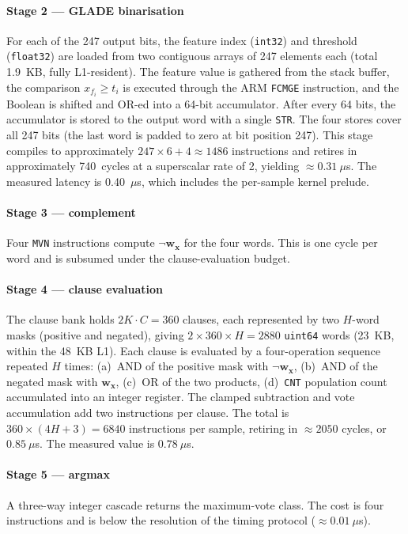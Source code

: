 \documentclass[journal,10pt]{IEEEtran}
\begin{document}
\paragraph{Stage 2 --- GLADE binarisation}
For each of the 247 output bits, the feature index (\texttt{int32})
and threshold (\texttt{float32}) are loaded from two contiguous
arrays of 247 elements each (total 1.9~KB, fully L1-resident). The
feature value is gathered from the stack buffer, the comparison
$x_{f_i} \ge t_i$ is executed through the ARM \texttt{FCMGE}
instruction, and the Boolean is shifted and OR-ed into a 64-bit
accumulator. After every 64 bits, the accumulator is stored to the
output word with a single \texttt{STR}. The four stores cover all
247 bits (the last word is padded to zero at bit position 247).
This stage compiles to approximately $247 \times 6 + 4 \approx 1486$
instructions and retires in approximately 740~cycles at a
superscalar rate of 2, yielding $\approx 0.31~\mu$s. The measured
latency is 0.40~$\mu$s, which includes the per-sample kernel prelude.

\paragraph{Stage 3 --- complement}
Four \texttt{MVN} instructions compute $\neg\mathbf{w}_\mathbf{x}$
for the four words. This is one cycle per word and is subsumed under
the clause-evaluation budget.

\paragraph{Stage 4 --- clause evaluation}
The clause bank holds $2K \cdot C = 360$ clauses, each represented
by two $H$-word masks (positive and negated), giving $2 \times 360
\times H = 2880$ \texttt{uint64} words (23~KB, within the 48~KB L1).
Each clause is evaluated by a four-operation sequence repeated $H$
times: (a)~AND of the positive mask with $\neg\mathbf{w}_\mathbf{x}$,
(b)~AND of the negated mask with $\mathbf{w}_\mathbf{x}$,
(c)~OR of the two products, (d)~\texttt{CNT} population count
accumulated into an integer register. The clamped subtraction and
vote accumulation add two instructions per clause. The total is
$360 \times (4H + 3) = 6840$ instructions per sample, retiring in
$\approx 2050$ cycles, or $0.85~\mu$s. The measured value is
$0.78~\mu$s.

\paragraph{Stage 5 --- argmax}
A three-way integer cascade returns the maximum-vote class. The cost
is four instructions and is below the resolution of the timing
protocol ($\approx 0.01~\mu$s).
\end{document}
